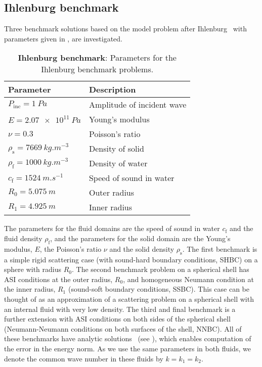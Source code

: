 \subsection{Ihlenburg benchmark}
Three benchmark solutions based on the model problem after Ihlenburg~\cite[p. 191]{Ihlenburg1998fea} with parameters given in , are investigated. 
\begin{table}
	\centering
	\caption{\textbf{Ihlenburg benchmark}: Parameters for the Ihlenburg benchmark problems.}
	\label{Tab2:IhlenburgParameters}
	\begin{tabular}{l l}
		\toprule
		Parameter & Description\\
		\midrule
		$P_{\mathrm{inc}}=\SI{1}{Pa}$ & Amplitude of incident wave\\
		$E = \SI{2.07e11}{Pa}$ & Young's modulus\\
		$\nu = 0.3$ & Poisson's ratio\\
		$\rho_{\mathrm{s}} = \SI{7669}{kg.m^{-3}}$ & Density of solid\\
		$\rho_{\mathrm{f}} = \SI{1000}{kg.m^{-3}}$ & Density of water\\
		$c_{\mathrm{f}} = \SI{1524}{m.s^{-1}}$ & Speed of sound in water\\
		$R_0=\SI{5.075}{m}$ & Outer radius\\
		$R_1=\SI{4.925}{m}$ & Inner radius\\
		\bottomrule
	\end{tabular}
\end{table}
The parameters for the fluid domains are the speed of sound in water $c_{\mathrm{f}}$ and the fluid density $\rho_{\mathrm{f}}$, and the parameters for the solid domain are the Young's modulus, $E$, the Poisson's ratio $\nu$ and the solid density $\rho_{\mathrm{s}}$. The first benchmark is a simple rigid scattering case (with sound-hard boundary conditions, SHBC) on a sphere with radius $R_0$. The second benchmark problem on a spherical shell has ASI conditions at the outer radius, $R_0$, and homogeneous Neumann condition at the inner radius, $R_1$ (sound-soft boundary conditions, SSBC). This case can be thought of as an approximation of a scattering problem on a spherical shell with an internal fluid with very low density. The third and final benchmark is a further extension with ASI conditions on both sides of the spherical shell (Neumann-Neumann conditions on both surfaces of the shell, NNBC). All of these benchmarks have analytic solutions~\cite{Venas2019e3s} (see ), which enables computation of the error in the energy norm. As we use the same parameters in both fluids, we denote the common wave number in these fluids by $k=k_1=k_2$.
